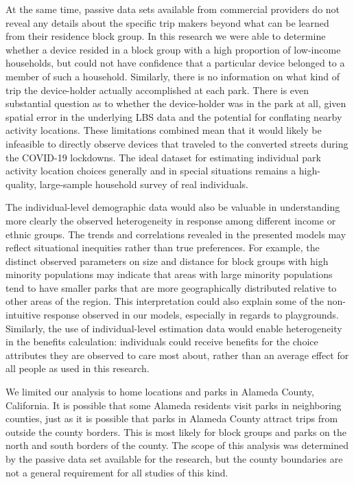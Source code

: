 \documentclass[3p, authoryear, review]{elsarticle} %
\begin{document}
At the same time, passive data sets available from commercial providers do not
reveal any details about the specific trip makers beyond what can be learned
from their residence block group. In this research we were able to determine
whether a device resided in a block group with a high proportion of low-income
households, but could not have confidence that a particular device belonged to a
member of such a household. Similarly, there is no information on what kind of
trip the device-holder actually accomplished at each park. There is even
substantial question as to whether the device-holder was in the park
at all, given spatial error in the underlying LBS data and the potential
for conflating nearby activity locations. These limitations
combined mean that it would likely be infeasible to directly observe devices
that traveled to the converted streets during the COVID-19 lockdowns. The ideal
dataset for estimating individual park activity location choices generally and
in special situations remains a high-quality, large-sample household survey of
real individuals.

The individual-level demographic data would also be valuable in understanding
more clearly the observed heterogeneity in response among different income or
ethnic groups. The trends and correlations revealed in the presented models may
reflect situational inequities rather than true preferences. For example, the
distinct observed parameters on size and distance for block groups with high
minority populations may indicate that areas with large minority populations
tend to have smaller parks that are more geographically distributed relative to
other areas of the region. This interpretation could also explain some of the
non-intuitive response observed in our models, especially in regards to
playgrounds. Similarly, the use of individual-level estimation data would enable
heterogeneity in the benefits calculation: individuals could receive benefits for
the choice attributes they are observed to care most about, rather than an average
effect for all people as used in this research.

We limited our analysis to home locations and parks in Alameda County,
California. It is possible that some Alameda residents visit parks in
neighboring counties, just as it is possible that parks in Alameda County
attract trips from outside the county borders. This is most likely for block
groups and parks on the north and south borders of the county. The scope of this
analysis was determined by the passive data set available for the research, but
the county boundaries are not a general requirement for all studies of this
kind.
\end{document}
